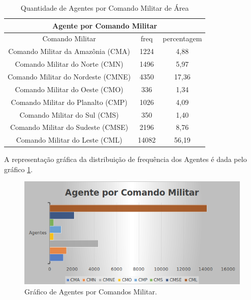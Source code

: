 \begin{table}[H]
\centering
\begin{tabular}{|c | c| c|} 
 \multicolumn{3}{c}{Agente por Comando Militar}\\ \hline
  Comando Militar & freq  & percentagem \\ [0.5ex] 
 \hline
 Comando Militar da Amazônia (CMA) &  1224 & 4,88\\ 
 \hline
 Comando Militar do Norte (CMN) &  1496 & 5,97\\
 \hline
 Comando Militar do Nordeste (CMNE) &  4350 & 17,36\\
 \hline
 Comando Militar do Oeste (CMO) &  336 & 1,34\\
 \hline
 Comando Militar do Planalto (CMP) &  1026 & 4,09\\
 \hline
 Comando Militar do Sul (CMS) &  350 & 1,40\\
 \hline
 Comando Militar do Sudeste (CMSE) &  2196 & 8,76\\
 \hline
 Comando Militar do Leste (CML) &  14082 & 56,19\\ [1ex] 
 \hline
\end{tabular}
\caption{Quantidade de Agentes por Comando Militar de Área}
\label{QuantidadeAgentes}
\end{table}

A representação gráfica da distribuição de frequência dos Agentes é dada pelo gráfico \ref{figuraAgentes}.
\begin{figure}[H]
        \centering
        \includegraphics[width=1\textwidth]{Figuras/qtde_agentes.png}
        \caption{Gráfico de Agentes por Comandos Militar.}
        \label{figuraAgentes}
\end{figure}

